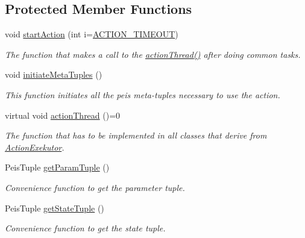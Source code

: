 \subsection*{\-Protected \-Member \-Functions}
\begin{DoxyCompactItemize}
\item 
void \hyperlink{classexekutor_1_1ActionExekutor_ab654dafa7b307003c35124509e3d8505}{start\-Action} (int i=\hyperlink{action__exekutor_8h_a5b040d9757224739efa101219b820edc}{\-A\-C\-T\-I\-O\-N\-\_\-\-T\-I\-M\-E\-O\-U\-T})
\begin{DoxyCompactList}\small\item\em \-The function that makes a call to the \hyperlink{classexekutor_1_1ActionExekutor_ab80a1327f11113222157cfec0abd9e9b}{action\-Thread()} after doing common tasks. \end{DoxyCompactList}\item 
void \hyperlink{classexekutor_1_1ActionExekutor_ae2f81a4994766a040bf6fa1cf36fbfb5}{initiate\-Meta\-Tuples} ()
\begin{DoxyCompactList}\small\item\em \-This function initiates all the peis meta-\/tuples necessary to use the action. \end{DoxyCompactList}\item 
virtual void \hyperlink{classexekutor_1_1ActionExekutor_ab80a1327f11113222157cfec0abd9e9b}{action\-Thread} ()=0
\begin{DoxyCompactList}\small\item\em \-The function that has to be implemented in all classes that derive from \hyperlink{classexekutor_1_1ActionExekutor}{\-Action\-Exekutor}. \end{DoxyCompactList}\item 
\-Peis\-Tuple \hyperlink{classexekutor_1_1ActionExekutor_ac1e62ad386692ab2cd7e8ae2173f1eb5}{get\-Param\-Tuple} ()
\begin{DoxyCompactList}\small\item\em \-Convenience function to get the parameter tuple. \end{DoxyCompactList}\item 
\-Peis\-Tuple \hyperlink{classexekutor_1_1ActionExekutor_aad1e82b7d1c173dd1c8f81967d7374b3}{get\-State\-Tuple} ()
\begin{DoxyCompactList}\small\item\em \-Convenience function to get the state tuple. \end{DoxyCompactList}\item 

\end{DoxyCompactItemize}
